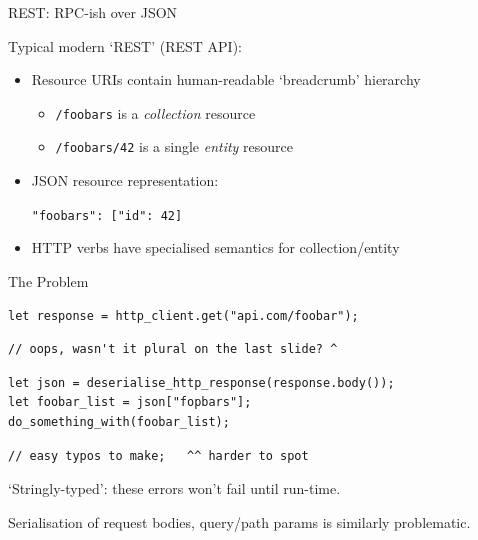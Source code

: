 \documentclass[10pt]{beamer}
\begin{document}
\begin{frame}{REST: RPC-ish over JSON}

    Typical modern `REST' (REST API):
    \begin{itemize}[<+->]
        \item Resource URIs contain human-readable `breadcrumb' hierarchy
        \begin{itemize}[<.(1)->]
            \item \texttt{/foobars} is a \emph{collection} resource
            \item \texttt{/foobars/42} is a single \emph{entity} resource
        \end{itemize}\pause
        \item JSON resource representation:
            \begin{small}\texttt{{"foobars": [{"id": 42}]}}\end{small}
        \item HTTP verbs have specialised semantics for collection/entity
    \end{itemize}

\end{frame}

\begin{frame}[fragile]{The Problem}

    \begin{verbatim}
let response = http_client.get("api.com/foobar");
    \end{verbatim}

    \pause
    \begin{verbatim}
// oops, wasn't it plural on the last slide? ^
    \end{verbatim}

    \pause
    \begin{verbatim}
let json = deserialise_http_response(response.body());
let foobar_list = json["fopbars"];
do_something_with(foobar_list);
    \end{verbatim}

    \pause
    \begin{verbatim}
// easy typos to make;   ^^ harder to spot
    \end{verbatim}
    
    \pause
    \begin{alert}{`Stringly-typed'}: these errors won't fail until run-time.\end{alert}

    \pause
    \begin{small}Serialisation of request bodies, query/path params is similarly problematic.\end{small}
\end{frame}
\end{document}
